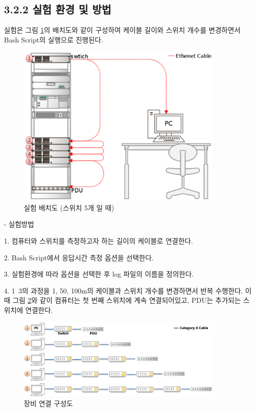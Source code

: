 \documentclass[11pt
  , a4paper
  , article
  , oneside
]{memoir}
\begin{document}
\subsection{3.2.2 실험 환경 및 방법}
실험은 그림 \ref{fig:switch5}의 배치도와 같이 구성하여 케이블 길이와 스위치 개수를 변경하면서 Bash Script의 실행으로 진행된다.

\begin{figure}[!htb]
  \centering
  \includegraphics[width=0.9\textwidth]{./images/switch5.eps}
  \caption{실험 배치도 (스위치 5개 일 때)}
  \label{fig:switch5}   
\end{figure}

\clearpage

- 실험방법 \par

1. 컴퓨터와 스위치를 측정하고자 하는 길이의 케이블로 연결한다.\par
2. Bash Script에서 응답시간 측정 옵션을 선택한다.\par
3. 실험환경에 따라 옵션을 선택한 후 log 파일의 이름을 정의한다.\par
4. 1~3의 과정을 1, 50, 100m의 케이블과 스위치 개수를 변경하면서 반복 수행한다. 이때 그림 \ref{fig:devcon}와 같이 컴퓨터는 첫 번째 스위치에 계속 연결되어있고, PDU는 추가되는 스위치에 연결한다. \par

\begin{figure}[!htb]
  \centering
  \includegraphics[width=0.9\textwidth]{./images/deviceconnet.eps}
  \caption{장비 연결 구성도}
  \label{fig:devcon}   
\end{figure}
\end{document}
